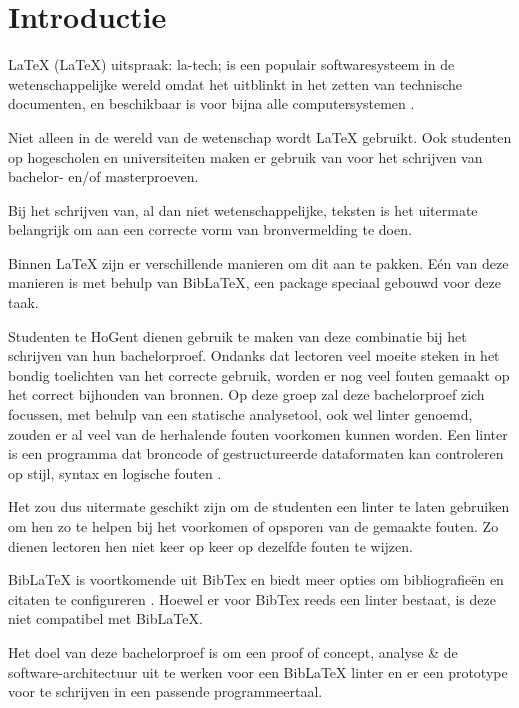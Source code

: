 
\section{Introductie}%
\label{sec:introductie}

LaTeX (\LaTeX) uitspraak: la-tech; is een populair softwaresysteem in de wetenschappelijke wereld omdat het uitblinkt in het zetten van technische documenten,
en beschikbaar is voor bijna alle computersystemen \autocite{Oetiker2023}.

Niet alleen in de wereld van de wetenschap wordt LaTeX gebruikt. Ook studenten op hogescholen en universiteiten maken er gebruik van voor het schrijven van bachelor- en/of masterproeven.

Bij het schrijven van, al dan niet wetenschappelijke, teksten is het uitermate belangrijk om aan een correcte vorm van bronvermelding te doen.

Binnen LaTeX zijn er verschillende manieren om dit aan te pakken. Eén van deze manieren is met behulp van BibLaTeX, een package speciaal gebouwd voor deze taak.

Studenten te HoGent dienen gebruik te maken van deze combinatie bij het schrijven van hun bachelorproef. Ondanks dat lectoren veel moeite steken in het bondig toelichten van het correcte gebruik, worden er nog veel fouten gemaakt op het correct bijhouden van bronnen. 
Op deze groep zal deze bachelorproef zich focussen, met behulp van een statische analysetool, ook wel linter genoemd, zouden er al veel van de herhalende fouten voorkomen kunnen worden. Een linter is een programma dat broncode of gestructureerde dataformaten kan controleren op stijl, syntax en logische fouten \autocite{Kamunya2023}.

Het zou dus uitermate geschikt zijn om de studenten een linter te laten gebruiken om hen zo te helpen bij het voorkomen of opsporen van de gemaakte fouten. Zo dienen lectoren hen niet keer op keer op dezelfde fouten te wijzen.

BibLaTeX is voortkomende uit BibTex en biedt meer opties om bibliografieën en citaten te configureren \autocite{Cassidy2013}. Hoewel er voor BibTex reeds een linter bestaat, is deze niet compatibel met BibLaTeX.

Het doel van deze bachelorproef is om een proof of concept, analyse \& de software-architectuur uit te werken voor een BibLaTeX linter en er een prototype voor te schrijven in een passende programmeertaal. 

